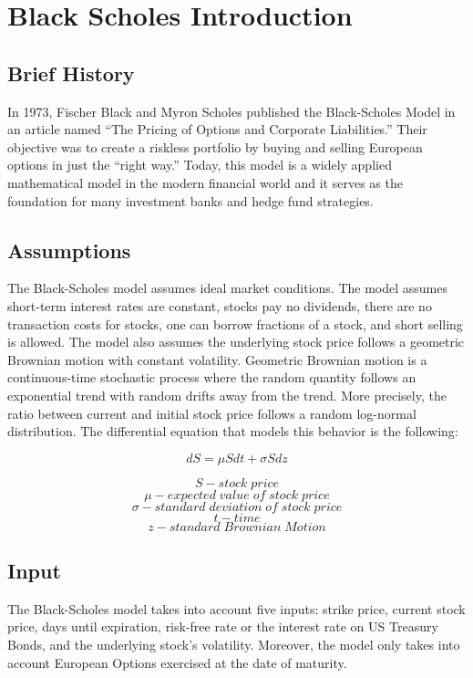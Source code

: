 %

\section{Black Scholes Introduction}

\subsection{Brief History}
In 1973, Fischer Black and Myron Scholes published the Black-Scholes Model in an article named “The Pricing of Options and Corporate Liabilities.” Their objective was to create a riskless portfolio by buying and selling European options in just the “right way.”  Today, this model is a widely applied mathematical model in the modern financial world and it serves as the foundation for many investment banks and hedge fund strategies.

\subsection{Assumptions}
The Black-Scholes model assumes ideal market conditions. The model assumes short-term interest rates are constant, stocks pay no dividends, there are no transaction costs for stocks, one can borrow fractions of a stock, and short selling is allowed. The model also assumes the underlying stock price follows a geometric Brownian motion with constant volatility. Geometric Brownian motion is a continuous-time stochastic process where the random quantity follows an exponential trend with random drifts away from the trend. More precisely, the ratio between current and initial stock price follows a random log-normal distribution. The differential equation that models this behavior is the following:

\[ dS = \mu Sdt + \sigma Sdz\]


$$S - stock \;price$$
$$\mu - expected\;value\;of\;stock\;price$$
$$\sigma - standard\; deviation\; of\; stock\; price$$
$$t - time$$ 
$$z - standard\; Brownian\; Motion$$


\subsection{Input}
The Black-Scholes model takes into account five inputs: strike price, current stock price, days until expiration, risk-free rate or the interest rate on US Treasury Bonds, and the underlying stock's volatility. Moreover, the model only takes into account European Options exercised at the date of maturity. \cite{BS}


